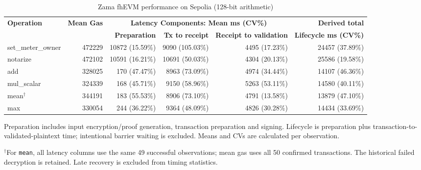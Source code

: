 \begin{table}[!t]
\caption{Zama fhEVM performance on Sepolia (128-bit arithmetic)}
\label{tab:zama-fhevm-sepolia-benchmark-128}
\centering
\scriptsize
\setlength{\tabcolsep}{4pt}
\begin{tabular}{|l|r|rrr|r|}
\hline
\textbf{Operation} &
\textbf{Mean Gas} &
\multicolumn{3}{c|}{\textbf{Latency Components: Mean ms (CV\%)}} &
\textbf{Derived total} \\
\cline{3-5}
& &
\textbf{Preparation} &
\textbf{Tx to receipt} &
\textbf{Receipt to validation} &
\textbf{Lifecycle ms (CV\%)} \\
\hline
set\_meter\_owner & 472229 & 10872 (15.59\%) & 9090 (105.03\%) & 4495 (17.23\%) & 24457 (37.89\%) \\
notarize & 472102 & 10591 (16.21\%) & 10691 (50.03\%) & 4304 (20.13\%) & 25586 (19.58\%) \\
add & 328025 & 170 (47.47\%) & 8963 (73.09\%) & 4974 (34.44\%) & 14107 (46.36\%) \\
mul\_scalar & 324339 & 168 (45.71\%) & 9150 (58.96\%) & 5263 (53.11\%) & 14580 (40.11\%) \\
mean\(^{\dagger}\) & 344191 & 183 (55.53\%) & 8906 (73.10\%) & 4791 (13.58\%) & 13879 (47.10\%) \\
max & 330054 & 244 (36.22\%) & 9364 (48.09\%) & 4826 (30.28\%) & 14434 (33.69\%) \\
\hline
\end{tabular}
\vspace{2pt}
\parbox{\textwidth}{\scriptsize Preparation includes input encryption/proof generation, transaction preparation and signing. Lifecycle is preparation plus transaction-to-validated-plaintext time; intentional barrier waiting is excluded. Means and CVs are calculated per observation.}
\parbox{\textwidth}{\scriptsize \(^{\dagger}\)For \texttt{mean}, all latency columns use the same 49 successful observations; mean gas uses all 50 confirmed transactions. The historical failed decryption is retained. Late recovery is excluded from timing statistics.}
\end{table}

